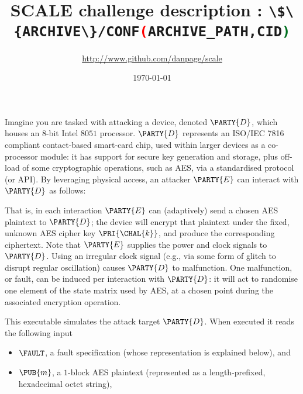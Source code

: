 \documentclass[crop={false},multi={true},tikz={true}]{standalone}
\begin{document}
\ifstandalone
\author{\url{http://www.github.com/danpage/scale}}
\title{\Large SCALE challenge description : \lstinline[language={bash}]|\$\{ARCHIVE\}/CONF(ARCHIVE_PATH,CID)|}
\date{\today}

\maketitle
\fi



Imagine you are tasked with attacking a device, denoted $\PARTY{D}$, 
which houses an $8$-bit Intel $8051$ processor.
$\PARTY{D}$ represents an ISO/IEC 7816 compliant contact-based smart-card
chip, used within larger devices as a co-processor module: it has support
for secure key generation and storage, plus off-load of some cryptographic 
operations, such as AES, via a standardised protocol (or API).
By leveraging physical access, 
an attacker $\PARTY{E}$ can interact with $\PARTY{D}$ as follows:

\begin{center}

\end{center}

\noindent
That is, in each interaction $\PARTY{E}$ can (adaptively) send 
a chosen AES  plaintext
to $\PARTY{D}$; the device will
encrypt that  plaintext under the fixed, unknown AES cipher key $\PRI{\CHAL{k}}$,
and produce 
the corresponding ciphertext.
Note that $\PARTY{E}$ supplies the power and clock signals to $\PARTY{D}$.
Using an irregular clock signal (e.g., via some form of glitch to disrupt 
regular oscillation) causes $\PARTY{D}$ to malfunction.  One malfunction, 
or fault, can be induced per interaction with $\PARTY{D}$: it will act to 
randomise one element of the state matrix used by AES, at a chosen point 
during the associated encryption operation.



This executable simulates the attack target $\PARTY{D}$.  When executed it 
reads the following input

\begin{itemize}
\item $\FAULT$, 
      a  fault specification
      (whose representation is explained below),
      and
\item $\PUB{m}$,
      a  ${1}$-block AES plaintext
      (represented as a  length-prefixed, hexadecimal octet   string),
\end{itemize}
\end{document}
